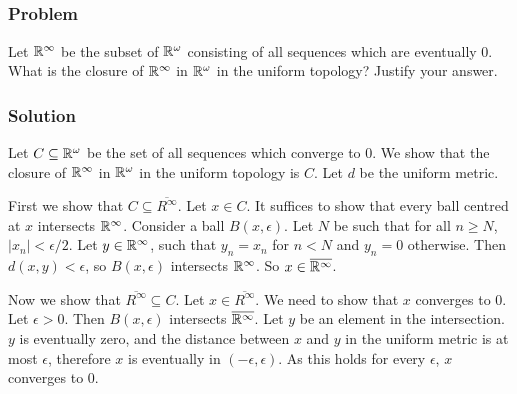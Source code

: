 
\setcounter{subsection}{4} %
\subsection{}

\subsubsection{Problem}
Let $\mathbb R^\infty$ be the subset of $\mathbb R^\omega$ consisting of all sequences which are eventually $0$. What is the closure of $\mathbb R^\infty$ in $\mathbb R^\omega$ in the uniform topology? Justify your answer.

\subsubsection{Solution}
Let $C \subseteq \mathbb R^\omega$ be the set of all sequences which converge to $0$. We show that the closure of $\mathbb R^\infty$ in $\mathbb R^\omega$ in the uniform topology is $C$. Let $d$ be the uniform metric.

First we show that $C \subseteq \overline{R^\infty}$. Let $x \in C$. It suffices to show that every ball centred at $x$ intersects $\mathbb R^\infty$. Consider a ball $B(x, \epsilon)$. Let $N$ be such that for all $n \geq N$, $|x_n| < \epsilon/2$. Let $y \in \mathbb R^\infty$, such that $y_n = x_n$ for $n < N$ and $y_n = 0$ otherwise. Then $d(x,y) < \epsilon$, so $B(x, \epsilon)$ intersects $\mathbb R^\infty$. So $x \in \overline{\mathbb R^\infty}$.

Now we show that $\overline{R^\infty} \subseteq C$. Let $x \in \overline{R^\infty}$. We need to show that $x$ converges to $0$. Let $\epsilon > 0$. Then $B(x, \epsilon)$ intersects $\overline{\mathbb R^\infty}$. Let $y$ be an element in the intersection. $y$ is eventually zero, and the distance between $x$ and $y$ in the uniform metric is at most $\epsilon$, therefore $x$ is eventually in $(-\epsilon, \epsilon)$. As this holds for every $\epsilon$, $x$ converges to $0$.



\setcounter{subsection}{7} %
\subsection{}

